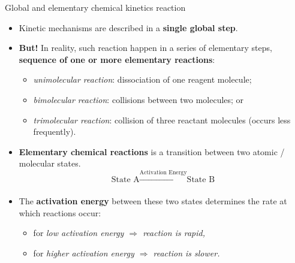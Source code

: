 %
%
\begin{frame}[<+->][shrink]{Global and elementary chemical kinetics reaction}
	
	\begin{itemize}
		\item Kinetic mechanisms are described in a \textbf{single global step}. 
		\item \textbf{But!} In reality, such reaction happen in a series of elementary steps, \textbf{sequence of one or more
			elementary reactions}:
		\begin{itemize}
			\item {\it unimolecular reaction}: dissociation of one reagent molecule;
			\item {\it bimolecular reaction}: collisions between two molecules; or
			\item{ \it trimolecular reaction}: collision of three reactant molecules (occurs less frequently).
		\end{itemize}
		\item \alert{\textbf{Elementary chemical reactions}} is a transition between two atomic / molecular states. 
		$$\mbox{State A} \xrightarrow[]{\text{Activation Energy}} \mbox{State B}$$
		\item The \textbf{activation energy} between these two states determines \alert{the rate at which reactions occur}: 
		\begin{itemize}
			\item for \it{low activation energy} $\Rightarrow$ reaction is rapid, 
			\item for \it{higher activation energy} $\Rightarrow$ reaction is slower.
		\end{itemize}
	\end{itemize}
	
\end{frame}
%
%
